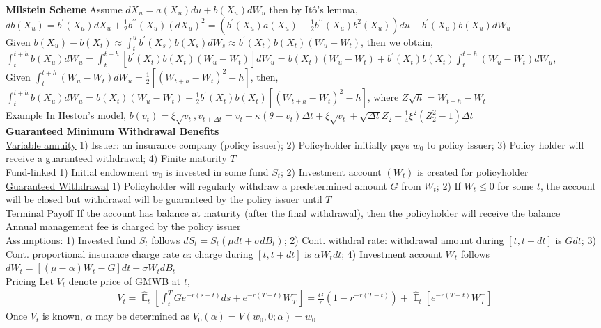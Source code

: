 \documentclass[12pt,landscape, a4paper]{article}
\theoremstyle{remark}
\newcommand{\E}{\operatorname{\mathbb{E}}}
\begin{document}
\begin{multicols*}{3}
\textbf{Milstein Scheme} Assume $d X_u = a (X_u) du + b (X_u) d W_u $ then by It\^{o}'s lemma,\\
$ d b (X_u) = b^{\prime} (X_u) d X_u + \frac{1}{2} b^{\prime \prime} (X_u) (d X_u)^2 = \left(b^{\prime} (X_u) a(X_u) + \frac{1}{2} b^{\prime \prime} (X_u) b^2 (X_u)  \right) du +b^\prime (X_u) b (X_u) d W_u$\\
Given $b (X_u) -  b(X_t) \approx \int^u_t b^\prime (X_s) b (X_s) d W_s \approx b^\prime (X_t) b (X_t) (W_u - W_t) $, then we obtain,\\
$\int^{t+ h}_t b(X_u) d W_u = \int^{t+ h}_t \left[ b^\prime (X_t) b (X_t) (W_u - W_t) \right] d W_u = b (X_t) (W_u - W_t) + b^\prime (X_t) b (X_t) \int^{t+h}_t (W_u - W_t) d W_u  $,\\
Given $\int^{t+h}_t (W_u - W_t) d W_u = \frac{1}{2} [(W_{t+h} - W_t)^2 -h ] $, then,\\
$\int^{t+ h}_t b(X_u) d W_u = b (X_t) (W_u - W_t) + \frac{1}{2} b^\prime (X_t) b (X_t)  [(W_{t+h} - W_t)^2 -h ]$, where $Z\sqrt{h} = W_{t+h} - W_t$\\
\underline{Example} In Heston's model, $b (v_t) = \xi \sqrt{v_t}, v_{t+ \Delta t} = v_t + \kappa (\theta - v_t) \Delta t + \xi \sqrt{v_t} + \sqrt{ \Delta t} Z_2 + \frac{1}{4} \xi^2 (Z^2_2 -1)\Delta t$
\\
\textbf{Guaranteed Minimum Withdrawal Benefits} \\
\underline{Variable annuity} 1) Issuer: an insurance company (policy issuer); 2) Policyholder initially pays $w_0$ to policy issuer; 3) Policy holder will receive a guaranteed withdrawal; 4) Finite maturity $T$ \\
\underline{Fund-linked} 1) Initial endowment $w_0$ is invested in some fund $S_t$; 2) Investment account $(W_t)$ is created for policyholder\\
\underline{Guaranteed Withdrawal} 1) Policyholder will regularly withdraw a predetermined amount $G$ from $W_t$; 2) If $W_t \leq 0$ for some $t$, the account will be closed but withdrawal will be guaranteed by the policy issuer until $T$\\
\underline{Terminal Payoff} If the account has balance at maturity (after the final withdrawal), then the policyholder will receive the balance\\
Annual management fee is charged by the policy issuer\\
\underline{Assumptions}: 1) Invested fund $S_t$ follows $d S_t = S_t (\mu dt + \sigma dB_t)$; 2) Cont. withdral rate: withdrawal amount during $[t, t+dt]$ is $G dt$; 3) Cont. proportional insurance charge rate $\alpha$: charge during $[t, t+dt]$ is $\alpha W_t dt$; 4) Investment account $W_t$ follows $d W_t = [(\mu - \alpha) W_t -G] dt + \sigma W_t d B_t$\\
\underline{Pricing} Let $V_t$ denote price of GMWB at $t$,
\begin{align*}
    V_t = \hat{\E}_t \left[\int^T_t G e^{-r (s-t)} ds + e^{-r (T-t)} W^+_T \right] = \frac{G}{r} \left(1- r^{-r(T-t)} \right) + \hat{\E}_t \left[e^{-r(T-t)} W^+_T \right]
\end{align*}
Once $V_t$ is known, $\alpha$ may be determined as $V_0 (\alpha) = V (w_0, 0; \alpha) = w_0$\\


\end{multicols*}
\end{document}
